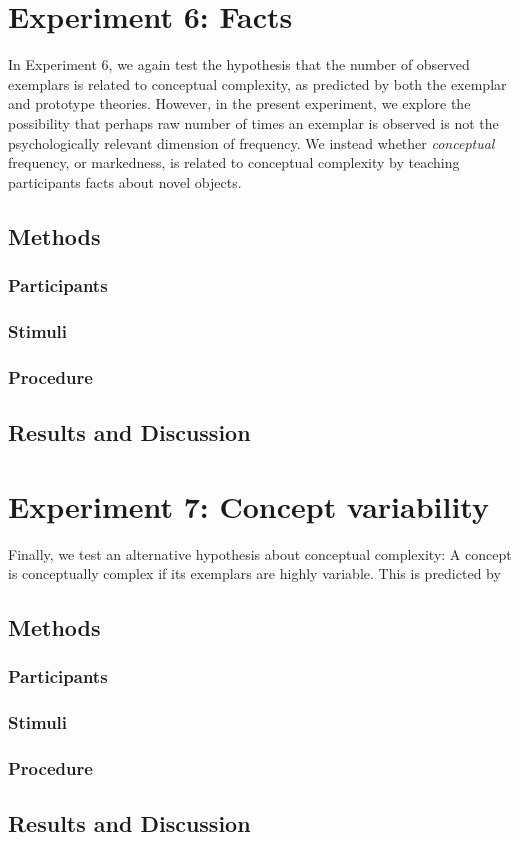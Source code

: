 \section{Experiment 6: Facts}
In Experiment 6, we again test the hypothesis that the number of observed exemplars is related to conceptual complexity, as predicted by both the exemplar and prototype theories. However, in the present experiment, we explore the possibility that perhaps raw number of times an exemplar is observed is not the psychologically relevant dimension of frequency. We instead whether {\it conceptual} frequency, or markedness, is related to conceptual complexity by teaching participants facts about novel objects. 

\subsection{Methods}
\subsubsection{Participants} 
\subsubsection{Stimuli} 
\subsubsection{Procedure}
\subsection{Results and Discussion}

\section{Experiment 7: Concept variability}
Finally, we test an alternative hypothesis about conceptual complexity: A concept is conceptually complex if its exemplars are highly variable. This is predicted by 
\subsection{Methods}
\subsubsection{Participants} 
\subsubsection{Stimuli} 
\subsubsection{Procedure}
\subsection{Results and Discussion}







